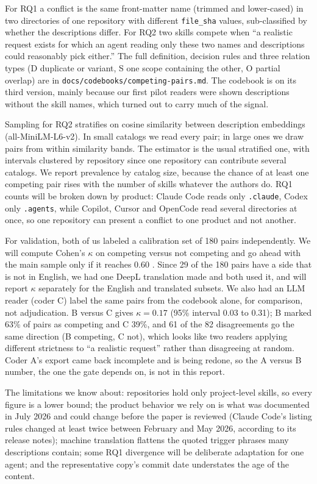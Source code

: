 \documentclass[11pt]{article}
\begin{document}
For RQ1 a conflict is the same front-matter name (trimmed and lower-cased) in two directories of one repository with
different \texttt{file\_sha} values, sub-classified by whether the descriptions differ. For RQ2 two skills compete when ``a
realistic request exists for which an agent reading only these two names and descriptions could reasonably pick either.''
The full definition, decision rules and three relation types (D duplicate or variant, S one scope containing the other, O
partial overlap) are in \texttt{docs/codebooks/competing-pairs.md}. The codebook is on its third version, mainly because our
first pilot readers were shown descriptions without the skill names, which turned out to carry much of the signal.

Sampling for RQ2 stratifies on cosine similarity between description embeddings (all-MiniLM-L6-v2). In small catalogs we
read every pair; in large ones we draw pairs from within similarity bands. The estimator is the usual stratified one, with
intervals clustered by repository since one repository can contribute several catalogs. We report prevalence by catalog size,
because the chance of at least one competing pair rises with the number of skills whatever the authors do. RQ1 counts will
be broken down by product: Claude Code reads only \texttt{.claude}, Codex only \texttt{.agents}, while Copilot, Cursor and
OpenCode read several directories at once, so one repository can present a conflict to one product and not another.

For validation, both of us labeled a calibration set of 180 pairs independently. We will compute Cohen's $\kappa$ on
competing versus not competing and go ahead with the main sample only if it reaches 0.60 \cite{landis1977kappa}. Since 29 of
the 180 pairs have a side that is not in English, we had one DeepL translation made and both used it, and will report
$\kappa$ separately for the English and translated subsets. We also had an LLM reader (coder C) label the same pairs from the
codebook alone, for comparison, not adjudication. B versus C gives $\kappa = 0.17$ (95\% interval 0.03 to 0.31); B marked
63\% of pairs as competing and C 39\%, and 61 of the 82 disagreements go the same direction (B competing, C not), which looks
like two readers applying different strictness to ``a realistic request'' rather than disagreeing at random. Coder A's
export came back incomplete and is being redone, so the A versus B number, the one the gate depends on, is not in this
report.

The limitations we know about: repositories hold only project-level skills, so every figure is a lower bound; the product
behavior we rely on is what was documented in July 2026 and could change before the paper is reviewed (Claude Code's listing
rules changed at least twice between February and May 2026, according to its release notes); machine translation flattens
the quoted trigger phrases many descriptions contain; some RQ1 divergence will be deliberate adaptation for one agent; and
the representative copy's commit date understates the age of the content.
\end{document}
